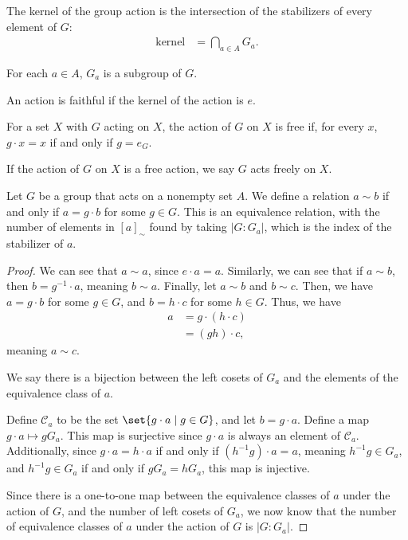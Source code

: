 \documentclass[10pt]{mypackage}
\begin{document}
\begin{note}
  The kernel of the group action is the intersection of the stabilizers of every element of $G$:
  \begin{align*}
    \text{kernel} &= \bigcap_{a\in A}G_a.
  \end{align*}
\end{note}
\begin{note}
  For each $a\in A$, $G_a$ is a subgroup of $G$.
\end{note}
\begin{definition}
  An action is faithful if the kernel of the action is $e$.
\end{definition}
\begin{definition}
  For a set $X$ with $G$ acting on $X$, the action of $G$ on $X$ is free if, for every $x$, $g\cdot x = x$ if and only if $g = e_G$.\newline

  If the action of $G$ on $X$ is a free action, we say $G$ acts freely on $X$.
\end{definition}
\begin{proposition}
  Let $G$ be a group that acts on a nonempty set $A$. We define a relation $a\sim b$ if and only if $a = g\cdot b$ for some $g\in G$. This is an equivalence relation, with the number of elements in $\left[a\right]_{\sim}$ found by taking $\left\vert G:G_a \right\vert$, which is the index of the stabilizer of $a$.
\end{proposition}
\begin{proof}
  We can see that $a\sim a$, since $e\cdot a = a$. Similarly, we can see that if $a\sim b$, then $b = g^{-1}\cdot a$, meaning $b\sim a$. Finally, let $a\sim b$ and $b\sim c$. Then, we have $a = g\cdot b$ for some $g\in G$, and $b = h\cdot c$ for some $h\in G$. Thus, we have
  \begin{align*}
    a &= g\cdot \left(h\cdot c\right)\\
      &= \left(gh\right)\cdot c,
  \end{align*}
  meaning $a\sim c$.\newline

  We say there is a bijection between the left cosets of $G_a$ and the elements of the equivalence class of $a$.\newline

  Define $\mathcal{C}_a$ to be the set $\set{g\cdot a\mid g\in G}$, and let $b = g\cdot a$. Define a map $g\cdot a \mapsto gG_a$. This map is surjective since $g\cdot a$ is always an element of $\mathcal{C}_a$. Additionally, since $g\cdot a = h\cdot a$ if and only if $\left(h^{-1}g\right)\cdot a = a$, meaning $h^{-1}g \in G_a$, and $h^{-1}g\in G_a$ if and only if $gG_a = hG_a$, this map is injective.\newline

  Since there is a one-to-one map between the equivalence classes of $a$ under the action of $G$, and the number of left cosets of $G_a$, we now know that the number of equivalence classes of $a$ under the action of $G$ is $\left\vert G:G_a \right\vert$.
\end{proof}
\end{document}
